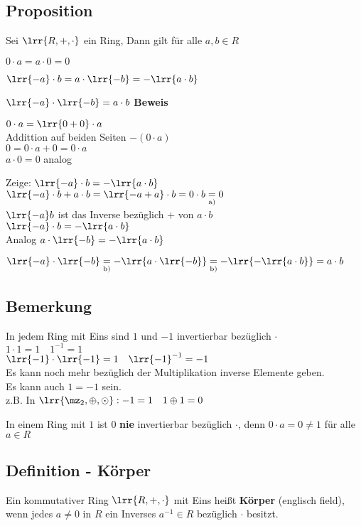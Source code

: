 \subsection{Proposition}
	Sei $\lrr{R,+,\cdot}$ ein Ring, Dann gilt für alle $a,b\in R$
		\item $0\cdot a=a\cdot 0=0$
		\item $\lrr{-a}\cdot b=a\cdot\lrr{-b}=-\lrr{a\cdot b}$
		\item $\lrr{-a}\cdot\lrr{-b}=a\cdot b$
	\subExEnd
	\textbf{Beweis}
		\item $0\cdot a =\lrr{0+0}\cdot a$ \\
			Addittion auf beiden Seiten $-(0\cdot a)$\\
			$0=0\cdot a+0=0\cdot a$\\
			$a\cdot 0=0$ analog
		\item Zeige: $\lrr{-a}\cdot b=-\lrr{a\cdot b}$\\
			$\lrr{-a}\cdot b+a\cdot b=\lrr{-a+a}\cdot b = 0\cdot b \underset{\mbox{\scriptsize a)}}{=} 0$\\
			$\lrr{-a}b$ ist das Inverse bezüglich $+$ von $a\cdot b$\\
			$\lrr{-a}\cdot b=-\lrr{a\cdot b}$\\
			Analog $a\cdot\lrr{-b}=-\lrr{a\cdot b}$
		\item $\lrr{-a}\cdot\lrr{-b}\underset{\mbox{\scriptsize b)}}{=}-\lrr{a\cdot\lrr{-b}}\underset{\mbox{\scriptsize b)}}{=}-\lrr{-\lrr{a\cdot b}}=a\cdot b$
	\subExEnd
\subsection{Bemerkung}
		\item In jedem Ring mit Eins sind $1$ und $-1$ invertierbar bezüglich $\cdot$\\
			$1\cdot 1=1\quad 1^{-1}=1$\\
			$\lrr{-1}\cdot\lrr{-1}=1\quad\lrr{-1}^{-1}=-1$\\
			Es kann noch mehr bezüglich der Multiplikation inverse Elemente geben.\\
			Es kann auch $1=-1$ sein.\\
			z.B. In $\lrr{\mz_2,\oplus,\odot}: -1=1\quad 1\oplus 1=0$
		\item In einem Ring mit $1$ ist $0$ \textbf{nie} invertierbar bezüglich $\cdot$, denn $0\cdot a=0\neq 1$ für alle $a\in R$
	\subExEnd
\subsection{Definition - Körper}
	Ein kommutativer Ring $\lrr{R,+,\cdot}$ mit Eins heißt \textbf{Körper} (englisch field), wenn jedes $a\neq 0$ in $R$ ein Inverses $a^{-1}\in R$ bezüglich $\cdot$ besitzt.
